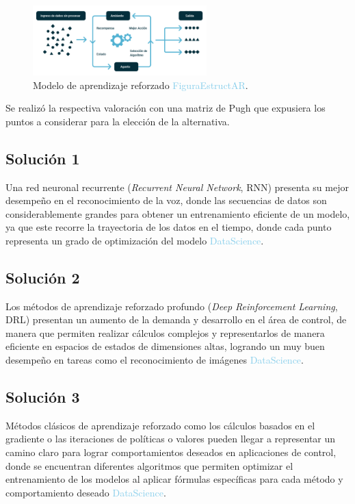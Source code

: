 \begin{figure}[h]
    \centering
    \includegraphics[width=0.6\textwidth]{fig/new/EstructuraAR.png}
    \caption{Modelo de aprendizaje reforzado \textcolor{SkyBlue}{FiguraEstructAR}.}
    \label{fig:EstructuraAR}
\end{figure}

Se realizó la respectiva valoración con una matriz de Pugh que expusiera los puntos a considerar para la elección de la alternativa.

\subsection{Solución 1}

Una red neuronal recurrente (\textit{Recurrent Neural Network}, RNN) presenta su mejor desempeño en el reconocimiento de la voz, donde las secuencias de datos son considerablemente grandes para obtener un entrenamiento eficiente de un modelo, ya que este recorre la trayectoria de los datos en el tiempo, donde cada punto representa un grado de optimización del modelo \textcolor{SkyBlue}{DataScience}.

\subsection{Solución 2} \label{SolucionSeleccionada}

Los métodos de aprendizaje reforzado profundo (\textit{Deep Reinforcement Learning}, DRL) presentan un aumento de la demanda y desarrollo en el área de control, de manera que permiten realizar cálculos complejos y representarlos de manera eficiente en espacios de estados de dimensiones altas, logrando un muy buen desempeño en tareas como el reconocimiento de imágenes \textcolor{SkyBlue}{DataScience}.

\subsection{Solución 3}

Métodos clásicos de aprendizaje reforzado como los cálculos basados en el gradiente o las iteraciones de políticas o valores pueden llegar a representar un camino claro para lograr comportamientos deseados en aplicaciones de control, donde se encuentran diferentes algoritmos que permiten optimizar el entrenamiento de los modelos al aplicar fórmulas específicas para cada método y comportamiento deseado \textcolor{SkyBlue}{DataScience}.


